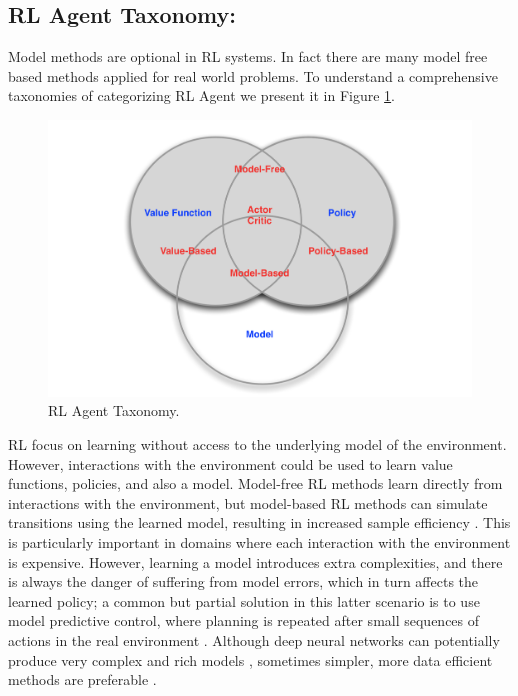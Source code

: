 \subsection*{RL Agent Taxonomy:}
Model methods are optional in RL systems. In fact there are many model free based methods applied for real world problems. To understand a comprehensive taxonomies of categorizing RL Agent we present it in Figure \ref{fig:taxonomy}.

\begin{figure}[t]
	\includegraphics[width=0.7\linewidth ]{fig/taxonomy.png}
    \vspace{-2mm}
    \caption{RL Agent Taxonomy.}
    \label{fig:taxonomy}
\end{figure}

RL focus on learning without access to the underlying
model of the environment. However, interactions with the
environment could be used to learn value functions, policies,
and also a model. Model-free RL methods learn directly
from interactions with the environment, but model-based RL
methods can simulate transitions using the learned model,
resulting in increased sample efficiency \cite{arulkumaran2017brief}. This is particularly
important in domains where each interaction with the environment
is expensive. However, learning a model introduces extra
complexities, and there is always the danger of suffering from
model errors, which in turn affects the learned policy; a common
but partial solution in this latter scenario is to use model
predictive control, where planning is repeated after small
sequences of actions in the real environment \cite{bertsekas2005dynamic}.
Although
deep neural networks can potentially produce very complex
and rich models \cite{oh2015action, finn2016deep}, sometimes simpler, more data efficient
methods are preferable \cite{gu2016continuous}.

